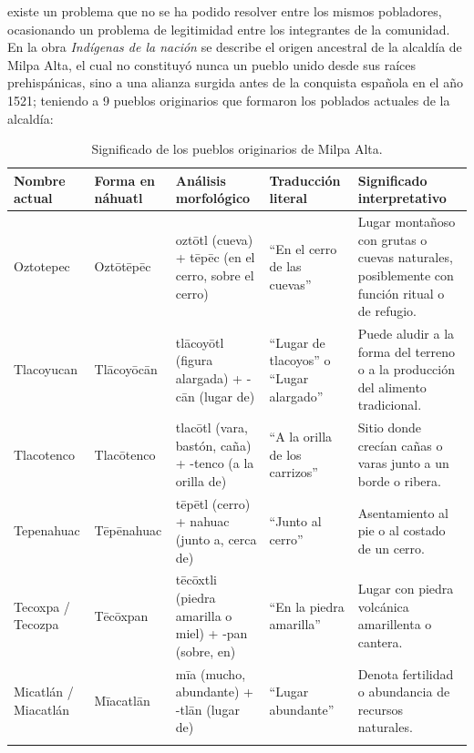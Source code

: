 existe un problema que no se ha podido resolver entre los mismos pobladores, ocasionando un problema de legitimidad entre los
integrantes de la comunidad. En la obra \textit{Indígenas de la nación} se describe el origen ancestral de la alcaldía de Milpa
Alta, el cual no constituyó nunca un pueblo unido desde sus raíces prehispánicas, sino a una alianza surgida antes de la
conquista española en el año 1521; teniendo a 9 pueblos originarios que formaron los poblados actuales de la alcaldía:
\begin{table}[H]
    \centering
    \caption[Significado de los pueblos originarios de Milpa Alta]{Significado de los pueblos originarios de Milpa Alta.}
    \label{tab:pueblos_milpa_alta}
    \fontsize{9pt}{11pt}\selectfont %
    \begin{tabularx}{\textwidth}{l l X X X}
        \toprule
        \textbf{Nombre actual} & \textbf{Forma en náhuatl} & \textbf{Análisis morfológico} & \textbf{Traducción literal} & \textbf{Significado interpretativo} \\
        \midrule
        Oztotepec & Oztōtēpēc & oztōtl (cueva) + tēpēc (en el cerro, sobre el cerro) & ``En el cerro de las cuevas'' & Lugar montañoso con grutas o cuevas naturales, posiblemente con función ritual o de refugio. \\
        \addlinespace
        Tlacoyucan & Tlācoyōcān & tlācoyōtl (figura alargada) + -cān (lugar de) & ``Lugar de tlacoyos'' o ``Lugar alargado'' & Puede aludir a la forma del terreno o a la producción del alimento tradicional. \\
        \addlinespace
        Tlacotenco & Tlacōtenco & tlacōtl (vara, bastón, caña) + -tenco (a la orilla de) & ``A la orilla de los carrizos'' & Sitio donde crecían cañas o varas junto a un borde o ribera. \\
        \addlinespace
        Tepenahuac & Tēpēnahuac & tēpētl (cerro) + nahuac (junto a, cerca de) & ``Junto al cerro'' & Asentamiento al pie o al costado de un cerro. \\
        \addlinespace
        Tecoxpa / Tecozpa & Tēcōxpan & tēcōxtli (piedra amarilla o miel) + -pan (sobre, en) & ``En la piedra amarilla'' & Lugar con piedra volcánica amarillenta o cantera. \\
        \addlinespace
        Micatlán / Miacatlán & Mīacatlān & mīa (mucho, abundante) + -tlān (lugar de) & ``Lugar abundante'' & Denota fertilidad o abundancia de recursos naturales. \\
        \addlinespace

\end{tabularx}
\end{table}
